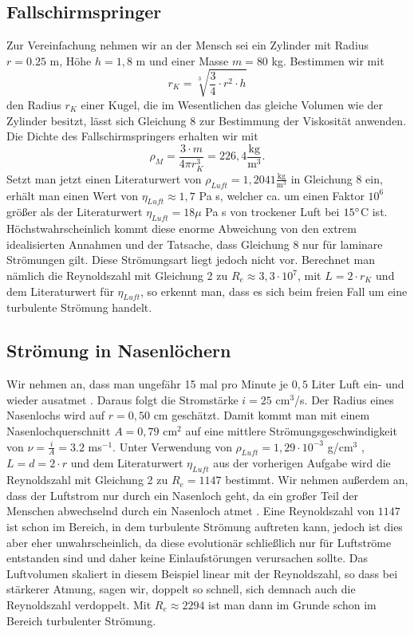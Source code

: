 \documentclass{article}
\begin{document}
\subsection{Fallschirmspringer}
Zur Vereinfachung nehmen wir an der Mensch sei ein Zylinder
mit Radius $r=0.25$ m, Höhe $h = 1,8$ m und einer Masse $m = 80
$ kg. Bestimmen wir mit
\begin{equation}
    r_K = \sqrt[3]{\frac{3}{4} \cdot r^2 \cdot h}
\end{equation}
den Radius $r_K$ einer Kugel, die im Wesentlichen das gleiche Volumen wie der Zylinder besitzt, lässt sich Gleichung 8 zur Bestimmung der Viskosität anwenden. Die Dichte des Fallschirmspringers erhalten wir mit
\begin{equation}
    \rho_M = \frac{3 \cdot m}{4\pi r_K^3} = 226,4   \frac{\textrm{kg}}{\textrm{m}^3}.
\end{equation}
Setzt man jetzt einen Literaturwert von $\rho_{Luft}= 1,2041 \frac{\textrm{kg}}{\textrm{m}^3}$ \cite{3} in Gleichung 8 ein, erhält man einen Wert von $\eta_{Luft} \approx 1,7$ Pa s, welcher ca. um einen Faktor $10^6$ größer als der Literaturwert $\eta_{Luft} = 18 \mu$ Pa s \cite{4} von trockener Luft bei $15 \degree $C ist. Höchstwahrscheinlich kommt diese enorme Abweichung von den extrem idealisierten Annahmen und der Tatsache, dass Gleichung 8 nur für laminare Strömungen gilt. Diese Strömungsart liegt jedoch nicht vor. Berechnet man nämlich die Reynoldszahl mit Gleichung 2 zu $R_e \approx 3,3 \cdot 10^7$, mit $L = 2 \cdot r_K$ und dem Literaturwert für $\eta_{Luft}$, so erkennt man, dass es sich beim freien Fall um eine turbulente Strömung handelt.

\subsection{Strömung in Nasenlöchern}
Wir nehmen an, dass man ungefähr 15 mal pro Minute je $0,5$ Liter Luft ein- und wieder ausatmet \cite{7}. Daraus folgt die Stromstärke $i = 25  $ cm$^3$/s. Der Radius eines Nasenlochs wird auf $r = 0,50$ cm geschätzt. Damit kommt man mit einem Nasenlochquerschnitt $A = 0,79$ cm$^2$ auf eine mittlere Strömungsgeschwindigkeit von $\nu= \frac{i}{A} = 3.2$ ms$^{-1}$. Unter Verwendung von $\rho_{Luft}= 1,29 \cdot 10^{-3}$ g/cm$^3$ \cite{1}, $L=d=2 \cdot r$ und dem Literaturwert $\eta_{Luft}$ aus der vorherigen Aufgabe wird die Reynoldszahl mit Gleichung 2 zu $R_e = 1147$ bestimmt. Wir nehmen außerdem an, dass der Luftstrom nur durch ein Nasenloch geht, da ein großer Teil der Menschen abwechselnd durch ein Nasenloch atmet \cite{5}. Eine Reynoldszahl von $1147$ ist schon im Bereich, in dem turbulente Strömung auftreten kann, jedoch ist dies aber eher unwahrscheinlich, da diese evolutionär schließlich nur für Luftströme entstanden sind und daher keine Einlaufstörungen verursachen sollte. Das Luftvolumen skaliert in diesem Beispiel linear mit der Reynoldszahl, so dass bei stärkerer Atmung, sagen wir, doppelt so schnell, sich demnach auch die Reynoldszahl verdoppelt. Mit $R_e \approx 2294$ ist man dann
im Grunde schon im Bereich turbulenter Strömung.
\end{document}
